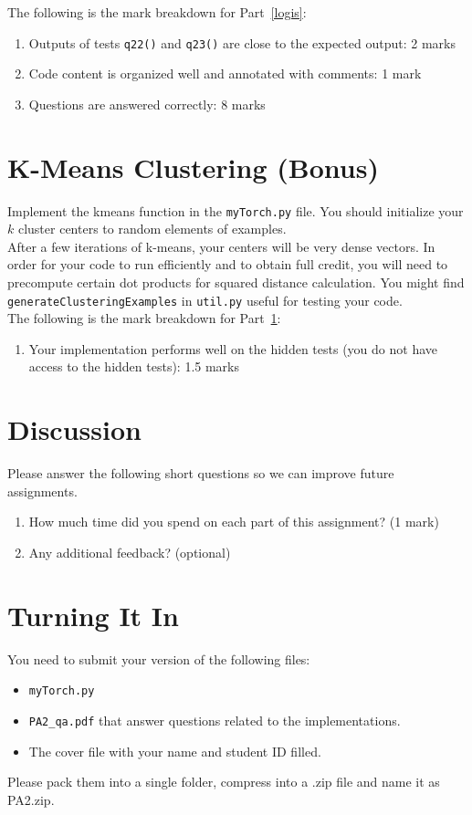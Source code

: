 \documentclass{article}
\theoremstyle{definition}
\begin{document}
The following is the mark breakdown for Part~\ref{logis}:
\begin{enumerate}[label=(\roman*)]
	\item Outputs of tests \verb|q22()| and \verb|q23()| are close to the expected output: 2 marks
	\item Code content is organized well and annotated with comments: 1 mark
	\item Questions are answered correctly: 8 marks
\end{enumerate}
\section{K-Means Clustering (Bonus)}\label{clus}
Implement the kmeans function in the \verb|myTorch.py| file. You should initialize your $k$ cluster centers to random elements of examples.\\

After a few iterations of k-means, your centers will be very dense vectors. In order for your code to run efficiently and to obtain full credit, you will need to precompute certain dot products for squared distance calculation. You might find \verb|generateClusteringExamples| in \verb|util.py| useful for testing your code.\\
The following is the mark breakdown for Part~\ref{clus}:
\begin{enumerate}[label=(\roman*)]
	\item Your implementation performs well on the hidden tests (you do not have access to the hidden tests): 1.5 marks
\end{enumerate}
\section{Discussion}\label{disc}
Please answer the following short questions so we can improve future assignments.
\begin{enumerate}[label=\ref{disc}.\alph*]
	\item How much time did you spend on each part of this assignment? (1 mark)
	\item Any additional feedback? (optional)
\end{enumerate}
\section{Turning It In}
You need to submit your version of the following files:
\begin{itemize}
	\item \verb|myTorch.py|
	\item \verb|PA2_qa.pdf| that answer questions related to the implementations.
	\item The cover file with your name and student ID filled.
\end{itemize}
Please pack them into a single folder, compress into a .zip file and name it as PA2.zip.
\end{document}
